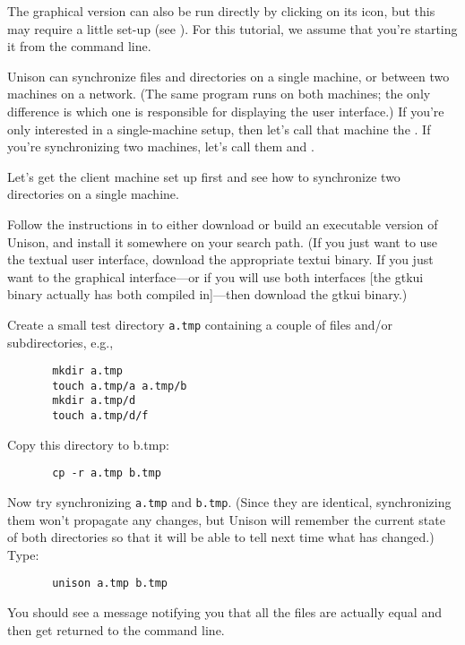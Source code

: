 \documentclass{article}
\begin{document}
The graphical version can also be run directly by clicking on its icon, but
this may require a little set-up (see ).  For this tutorial, we assume that you're starting it from the
command line.

Unison can synchronize files and directories on a single machine, or
between two machines on a network.  (The same program runs on both
machines; the only difference is which one is responsible for
displaying the user interface.)  If you're only interested in a
single-machine setup, then let's call that machine the \CLIENT{}.  If
you're synchronizing two machines, let's call them \CLIENT{} and
\SERVER.


Let's get the client machine set up first and see how to synchronize
two directories on a single machine.

Follow the instructions in  to either
download or build an executable version of Unison, and install it
somewhere on your search path.  (If you just want to use the textual user
interface, download the appropriate textui binary.  If you just want to
the graphical interface---or if you will use both interfaces [the gtkui
binary actually has both compiled in]---then download the gtkui binary.)

Create a small test directory {\tt a.tmp} containing a couple of files
and/or subdirectories, e.g.,
\begin{verbatim}
       mkdir a.tmp
       touch a.tmp/a a.tmp/b
       mkdir a.tmp/d
       touch a.tmp/d/f
\end{verbatim}
Copy this directory to b.tmp:
\begin{verbatim}
       cp -r a.tmp b.tmp
\end{verbatim}

Now try synchronizing {\tt a.tmp} and {\tt b.tmp}.  (Since they are
identical, synchronizing them won't propagate any changes, but Unison
will remember the current state of both directories so that it will be
able to tell next time what has changed.)  Type:
\begin{verbatim}
       unison a.tmp b.tmp
\end{verbatim}

\begin{textui}
You should see a message notifying you that all the files are actually
equal and then get returned to the command line.
\end{textui}
\end{document}
